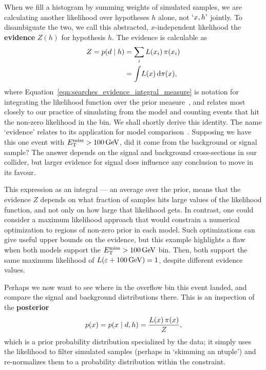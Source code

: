 When we fill a histogram by summing weights of simulated samples, we are
calculating another likelihood over hypotheses $h$ alone, not $`x, h\textrm{'}$
jointly.
To disambiguate the two, we call this abstracted, $x$-independent likelihood
the \textbf{evidence} $Z(h)$ for hypothesis $h$.
The evidence is calculable as
\begin{align}
Z
= \prob{d}{h} &= \sum_i L(x_i) \,\pi(x_i)
\label{eqn:searches_evidence_integral_sum}
\\
&= \int\! L(x) \,\mathrm{d}\pi(x),
\label{eqn:searches_evidence_integral_measure}
\end{align}
where Equation~\ref{eqn:searches_evidence_integral_measure} is notation for
integrating the likelihood function over the prior measure~\cite{
billingsley2008probability,
skilling2010foundations
}, and relates most closely to our practice of simulating from the model and
counting events that hit the non-zero likelihood in the bin.
We shall shortly derive this identity.
The name `evidence' relates to its application for model
comparison~\cite{mackay2003information}.
Supposing we have this one event with $\met > 100\,\eV[G]$, did it come from
the background or signal sample?
The answer depends on the signal and background cross-sections in our collider,
but larger evidence for signal does influence any conclusion to move in its
favour.

This expression as an integral --- an average over the prior, means that
the evidence $Z$ depends on what fraction of samples hits large values of
the likelihood function, and not only on how large that likelihood gets.
In contrast, one could consider a maximum likelihood approach that would
constrain a numerical optimization to regions of non-zero prior in each model.
Such optimizations can give useful upper bounds on the evidence, but this
example highlights a flaw when both models support the $\met > 100\,\eV[G]$
bin.
Then, both support the same maximum likelihood of
$L(\varepsilon + 100\,\eV[G]) = 1$, despite different evidence values.

Perhaps we now want to see where in the overflow bin this event landed, and
compare the signal and background distributions there.
This is an inspection of the \textbf{posterior}
\begin{equation}
p(x) = \prob{x}{d, h} = \frac{L(x)\,\pi(x)}{Z},
\end{equation}
which is a prior probability distribution specialized by the data;
it simply uses the likelihood to filter simulated samples
(perhaps in `skimming an ntuple')
and re-normalizes them to a probability distribution within the constraint.

